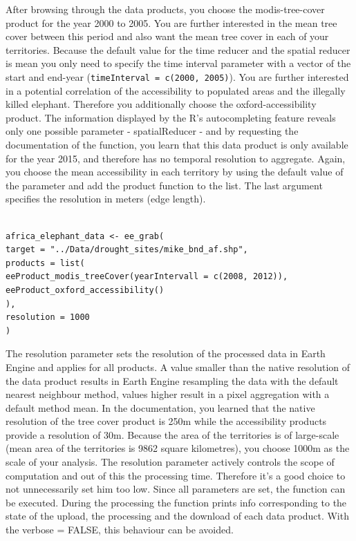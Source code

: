 After browsing through the data products, you choose the modis-tree-cover product for the year 2000 to 2005. You are further interested in the mean tree cover between this period and also want the mean tree cover in each of your territories. Because the default value for the time reducer and the spatial reducer is mean you only need to specify the time interval parameter with a vector of the start and end-year (\texttt{timeInterval = c(2000, 2005)}). You are further interested in a potential correlation of the accessibility to populated areas and the illegally killed elephant. Therefore you additionally choose the oxford-accessibility product. The information displayed by the R's autocompleting feature reveals only one possible parameter - spatialReducer - and by requesting the documentation of the function, you learn that this data product is only available for the year 2015, and therefore has no temporal resolution to aggregate. Again, you choose the mean accessibility in each territory by using the default value of the parameter and add the product function to the list. The last argument specifies the resolution in meters (edge length). 


\begin{lstlisting}

africa_elephant_data <- ee_grab(
target = "../Data/drought_sites/mike_bnd_af.shp",
products = list(
eeProduct_modis_treeCover(yearIntervall = c(2008, 2012)),
eeProduct_oxford_accessibility()
),
resolution = 1000
)
\end{lstlisting}



The resolution parameter sets the resolution of the processed data in Earth Engine and applies for all products. A value smaller than the native resolution of the data product results in Earth Engine resampling the data with the default nearest neighbour method, values higher result in a pixel aggregation with a default method mean. In the documentation, you learned that the native resolution of the tree cover product is 250m while the accessibility products provide a resolution of 30m. Because the area of the territories is of large-scale (mean area of the territories is 9862 square kilometres), you choose 1000m as the scale of your analysis. The resolution parameter actively controls the scope of computation and out of this the processing time. Therefore it's a good choice to not unnecessarily set him too low. 
Since all parameters are set, the function can be executed. 
During the processing the function prints info corresponding to the state of the upload, the processing and the download of each data product. With the verbose = FALSE, this behaviour can be avoided. 

